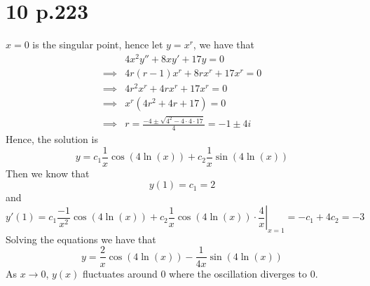 \documentclass[11pt]{article}
\begin{document}
\section*{10 p.223}
$x=0$ is the singular point, hence let $y = x^r$, we have that 
\begin{equation*}
    \begin{aligned}
        & 4x^2y'' + 8xy' + 17y = 0  \\
        \implies & 4r(r-1)x^r + 8rx^r + 17x^r = 0 \\
        \implies & 4r^2x^r + 4rx^r + 17x^r = 0 \\
        \implies & x^r(4r^2+4r+17) = 0 \\
        \implies &r = \frac{-4 \pm \sqrt{4^2-4\cdot 4 \cdot 17}}{4} =  -1 \pm 4i
    \end{aligned}
\end{equation*}
Hence, the solution is 
\[
    y = c_1\frac{1}{x}\cos\left(4\ln(x)\right) + c_2\frac{1}{x}\sin\left(4\ln(x)\right)   
\]
Then we know that 
\[
    y(1) = c_1 = 2
\] 
and 
\[
    y'(1) = \left. c_1 \frac{-1}{x^2}\cos(4\ln(x)) + c_2 \frac{1}{x} \cos(4\ln(x)) \cdot \frac{4}{x} \right|_{x=1} = -c_1 + 4c_2 = -3    
\]
Solving the equations we have that 
\[
    y = \frac{2}{x}\cos\left(4\ln(x)\right) -\frac{1}{4x}\sin\left(4\ln(x)\right)   
\]
As $x\to 0$, $y(x)$ fluctuates around 0 where the oscillation diverges to 0. 
\newpage
\end{document}
